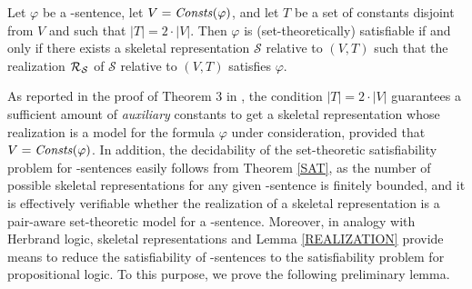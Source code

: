 \documentclass[manyauthors]{fundam}
\newcommand{\atset}{\mathcal{S}}
\begin{document}
\begin{theorem}\label{SAT}
Let $\varphi$ be a \Forallpizero-sentence, let $V=\mathit{Consts}(\varphi)$,
and let $T$ be a set of constants disjoint from $V$ and such that
$|T|=2\cdot|V|$. Then $\varphi$ is (set-theoretically) satisfiable
if and only if there exists a skeletal representation $\atset$
relative to $(V,T)$ such that the realization $\Realization_{\!\atset}$
of $\atset$ relative to $(V,T)$ satisfies $\varphi$. %
\end{theorem}
%
As reported in the proof of Theorem 3 in \cite{CanLonNic2011},
the condition $|T|=2\cdot|V|$ guarantees a sufficient amount of 
\emph{auxiliary} constants to get a skeletal representation whose realization
is a model for the formula $\varphi$ under consideration, provided that 
$V=\mathit{Consts}(\varphi)$. 
In addition, the decidability of the set-theoretic satisfiability problem for
\Forallpizero-sentences easily follows from Theorem \ref{SAT}, as the
number of possible skeletal representations for any given
\Forallpizero-sentence is finitely bounded, and it is effectively
verifiable whether the realization of a skeletal representation is a
pair-aware set-theoretic model for a \Forallpizero-sentence.
Moreover, in analogy with Herbrand logic, skeletal representations
and Lemma \ref{REALIZATION} provide means to reduce the satisfiability
of \Forallpizero-sentences to the satisfiability problem for 
propositional logic. To this purpose, we prove the following 
preliminary lemma.
\end{document}
